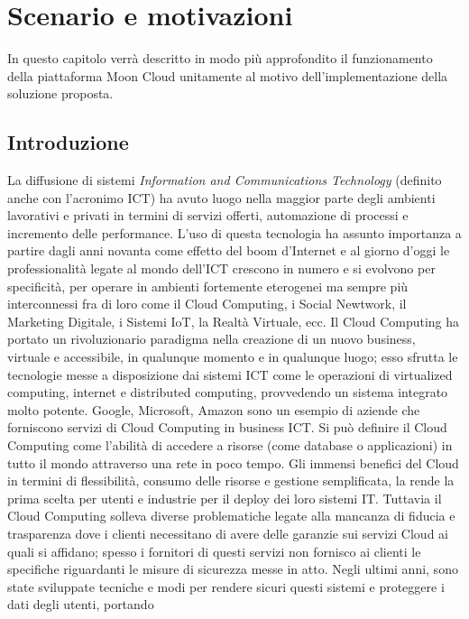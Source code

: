 \chapter{Scenario e motivazioni}\label{chp:01-overview}
In questo capitolo verrà descritto in modo più approfondito il funzionamento della piattaforma Moon Cloud unitamente al 
motivo dell'implementazione della soluzione proposta.
%
\section{Introduzione}
La diffusione di sistemi \textit{Information and Communications Technology} (definito anche con l'acronimo ICT) ha avuto luogo nella maggior parte degli ambienti 
lavorativi e privati in termini di servizi offerti, automazione di processi e incremento delle performance. L'uso di questa tecnologia 
ha assunto importanza a partire dagli anni novanta come effetto del boom d'Internet e al giorno d'oggi le professionalità legate al
mondo dell'ICT crescono in numero e si evolvono per specificità, per operare in ambienti fortemente eterogenei ma sempre più 
interconnessi fra di loro come il Cloud Computing, i Social Newtwork, il Marketing Digitale, i Sistemi IoT, la Realtà Virtuale, ecc.
\vspace{0.5 cm}\hfill\break
Il Cloud Computing ha portato un rivoluzionario paradigma nella creazione di un nuovo business, virtuale e accessibile, in qualunque momento
e in qualunque luogo; esso sfrutta le tecnologie messe a disposizione dai sistemi ICT come le operazioni di virtualized computing,
internet e distributed computing, provvedendo un sistema integrato molto potente. Google, Microsoft, Amazon sono un esempio di 
aziende che forniscono servizi di Cloud Computing in business ICT. Si può definire il Cloud Computing come l'abilità di accedere a 
risorse (come database o applicazioni) in tutto il mondo attraverso una rete in poco tempo.\hfill\break
Gli immensi benefici del Cloud in termini di flessibilità, consumo delle risorse e gestione semplificata, la rende la prima scelta per 
utenti e industrie per il deploy dei loro sistemi IT. Tuttavia il Cloud Computing solleva diverse problematiche legate alla mancanza di 
fiducia e trasparenza dove i clienti necessitano di avere delle garanzie sui servizi Cloud ai quali si affidano; spesso i fornitori di 
questi servizi non fornisco ai clienti le specifiche riguardanti le misure di sicurezza messe in atto.\hfill\break
Negli ultimi anni, sono state sviluppate tecniche e modi per rendere sicuri questi sistemi e proteggere i dati degli utenti, portando 
